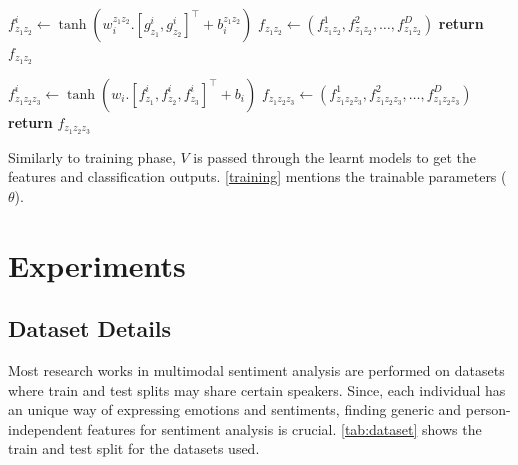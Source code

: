 \documentclass[review]{elsarticle}
\newcommand\?[1]{\hl{#1}}
\begin{document}
\begin{algorithm}[!ht]
\begin{algorithmic}[1]
        \vspace{2mm}
         
        \State $f_{z_1z_2}^i \gets \tanh(w_i^{z_1z_2}.[g^i_{z_1},
        g^i_{z_2}]^\intercal+b_i^{z_1z_2})$
        \EndFor
        \State $f_{z_1z_2} \gets (f_{z_1z_2}^1, f_{z_1z_2}^2,\dots,f_{z_1z_2}^{D})$
        \State \textbf{return} $f_{z_1z_2}$
        \EndProcedure
        
        
        \vspace{2mm}
         
        \State $f^i_{z_1z_2z_3} \gets \tanh(w_i.[f^i_{z_1}, f^i_{z_2}, f^i_{z_3}]^\intercal+b_i)$
        \EndFor
        \State $f_{z_1z_2z_3} \gets (f_{z_1z_2z_3}^1, f_{z_1z_2z_3}^2,\dots,f_{z_1z_2z_3}^{D})$
        \State \textbf{return} $f_{z_1z_2z_3}$
        \EndProcedure
        
        \vspace{2mm}
        \State \footnotesize{Similarly to training phase, $V$ is passed through the learnt models
        to get the features and classification outputs. \cref{training}
        mentions the trainable parameters ($\theta$).}
        \EndProcedure
    \end{algorithmic}
\end{algorithm}

\section{Experiments}
\label{sec:experiments}

\subsection{Dataset Details}
\label{datasets}
Most research works in multimodal sentiment analysis are performed on datasets
where train and test splits may share certain speakers. Since, each individual
has an unique way of expressing emotions and sentiments, finding generic and
person-independent features for sentiment analysis is
crucial. \cref{tab:dataset} shows the train and test split for the datasets
used.
\end{document}
